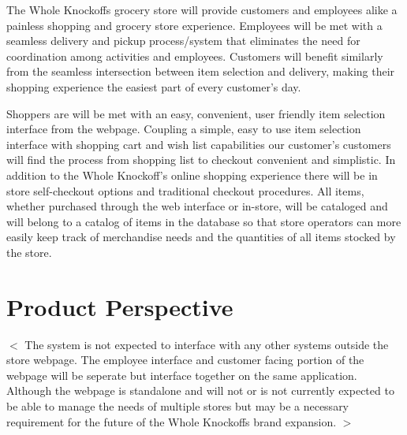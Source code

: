 \documentclass{scrreprt}
\theoremstyle{funreq}
\begin{document}
The Whole Knockoffs grocery store will provide customers and employees alike a painless shopping and grocery store experience. Employees will be met with a seamless delivery and pickup process/system that eliminates the need for coordination among activities and employees. Customers will benefit similarly from the seamless intersection between item selection and delivery, making their shopping experience the easiest part of every customer's day. 

Shoppers are will be met with an easy, convenient, user friendly item selection interface from the webpage. Coupling a simple, easy to use item selection interface with shopping cart and wish list capabilities our customer's customers will find the process from shopping list to checkout convenient and simplistic. In addition to the Whole Knockoff's online shopping experience there will be in store self-checkout options and traditional checkout procedures. All items, whether purchased through the web interface or in-store, will be cataloged and will belong to a catalog of items in the database so that store operators can more easily keep track of merchandise needs and the quantities of all items stocked by the store.


\section{Product Perspective}
$<$ The system is not expected to interface with any other systems outside the store webpage. The employee interface and customer facing portion of the webpage will be seperate but interface together on the same application. Although the webpage is standalone and will not or is not currently expected to be able to manage the needs of multiple stores but may be a necessary requirement for the future of the Whole Knockoffs brand expansion. $>$
\end{document}
